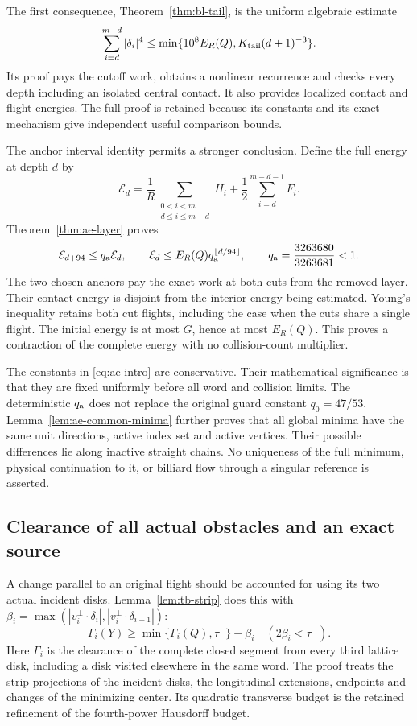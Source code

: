 \documentclass[11pt,reqno]{amsart}
\numberwithin{equation}{section}
\theoremstyle{definition}\newtheorem{definition}[theorem]{Definition}
\theoremstyle{remark}\newtheorem{remark}[theorem]{Remark}
\begin{document}
The first consequence, Theorem~\ref{thm:bl-tail}, is the uniform
algebraic estimate
\[
 \sum_{i=d}^{m-d}|\delta_i|^4
 \le\min\{10^8E_R(Q),K_{\rm tail}(d+1)^{-3}\}.
\]
Its proof pays the cutoff work, obtains a nonlinear recurrence and
checks every depth including an isolated central contact.  It also
provides localized contact and flight energies.  The full proof
is retained because its constants and its exact mechanism give
independent useful comparison bounds.

The anchor interval identity permits a stronger conclusion.
Define the full energy at depth $d$ by
\[
 \mathcal E_d=\frac1R
  \sum_{\substack{0<i<m\\ d\le i\le m-d}}H_i
            +\frac12\sum_{i=d}^{m-d-1}F_i.
\]
Theorem~\ref{thm:ae-layer} proves
\begin{equation}\label{eq:ae-intro}
 \mathcal E_{d+94}\le q_{\rm a}\mathcal E_d,\qquad
 \mathcal E_d\le E_R(Q)q_{\rm a}^{\lfloor d/94\rfloor},
 \qquad q_{\rm a}=\frac{3263680}{3263681}<1.
\end{equation}
The two chosen anchors pay the exact work at both cuts from the
removed layer.  Their contact energy is disjoint from the interior
energy being estimated.  Young's inequality retains both cut
flights, including the case when the cuts share a single flight.
The initial energy is at most $G$, hence at most $E_R(Q)$.
This proves a contraction of the complete energy with no
collision-count multiplier.

The constants in \eqref{eq:ae-intro} are conservative.  Their
mathematical significance is that they are fixed uniformly before
all word and collision limits.  The deterministic $q_{\rm a}$
does not replace the original guard constant $q_0=47/53$.
Lemma~\ref{lem:ae-common-minima} further proves that all global
minima have the same unit directions, active index set and active
vertices.  Their possible differences lie along inactive straight
chains.  No uniqueness of the full minimum, physical continuation
to it, or billiard flow through a singular reference is asserted.

\subsection*{Clearance of all actual obstacles and an exact source}
A change parallel to an original flight should be accounted for
using its two actual incident disks.  Lemma~\ref{lem:tb-strip}
does this with
$\beta_i=\max(|v_i^\perp\cdot\delta_i|,
             |v_i^\perp\cdot\delta_{i+1}|)$:
\[
 \Gamma_i(Y)\ge\min\{\Gamma_i(Q),\tau_-\}-\beta_i
                              \quad(2\beta_i<\tau_-).
\]
Here $\Gamma_i$ is the clearance of the complete closed segment
from every third lattice disk, including a disk visited elsewhere
in the same word.  The proof treats the strip projections of the
incident disks, the longitudinal extensions, endpoints and changes
of the minimizing center.  Its quadratic transverse budget is the retained
refinement of the fourth-power Hausdorff budget.
\end{document}

